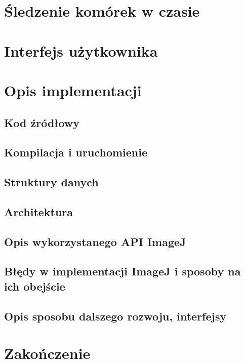 \documentclass[declaration,shortabstract]{iithesis}
\begin{document}
\section{Śledzenie komórek w czasie}





\section{Interfejs użytkownika}






\section{Opis implementacji}

\subsection{Kod źródłowy}
\subsection{Kompilacja i uruchomienie}

\subsection{Struktury danych}
\subsection{Architektura}
\subsection{Opis wykorzystanego API ImageJ}
\subsection{Błędy w implementacji ImageJ i sposoby na ich obejście}
\subsection{Opis sposobu dalszego rozwoju, interfejsy}







\section{Zakończenie}
\end{document}
